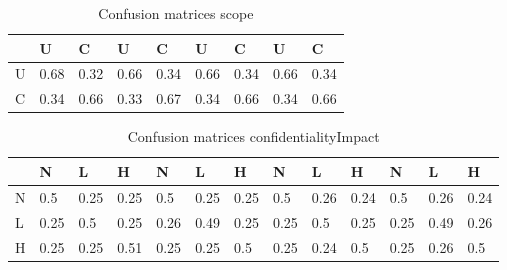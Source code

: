 \documentclass[11pt]{article}
\begin{document}
\begin{table}
	\caption{Confusion matrices scope}
	\label{table:mitre-scope}
	\begin{center}
		\begin{tabular}{l|l|l|l|l|l|l|l|l}\textbf{} & \textbf{U} & \textbf{C} & \textbf{U} & \textbf{C} & \textbf{U} & \textbf{C} & \textbf{U} & \textbf{C} \\
               \hline
               U                            & 0.68       & 0.32       & 0.66       & 0.34       & 0.66       & 0.34       & 0.66       & 0.34       \\
               C                            & 0.34       & 0.66       & 0.33       & 0.67       & 0.34       & 0.66       & 0.34       & 0.66       \\
		\end{tabular}
	\end{center}
\end{table}


\begin{table}
	\caption{Confusion matrices confidentialityImpact}
	\label{table:mitre-confidentialityImpact}
	\begin{center}
		\begin{tabular}{l|l|l|l|l|l|l|l|l|l|l|l|l}\textbf{} & \textbf{N} & \textbf{L} & \textbf{H} & \textbf{N} & \textbf{L} & \textbf{H} & \textbf{N} & \textbf{L} & \textbf{H} & \textbf{N} & \textbf{L} & \textbf{H} \\
               \hline
               N                                    & 0.5        & 0.25       & 0.25       & 0.5        & 0.25       & 0.25       & 0.5        & 0.26       & 0.24       & 0.5        & 0.26       & 0.24       \\
               L                                    & 0.25       & 0.5        & 0.25       & 0.26       & 0.49       & 0.25       & 0.25       & 0.5        & 0.25       & 0.25       & 0.49       & 0.26       \\
               H                                    & 0.25       & 0.25       & 0.51       & 0.25       & 0.25       & 0.5        & 0.25       & 0.24       & 0.5        & 0.25       & 0.26       & 0.5        \\
		\end{tabular}
	\end{center}
\end{table}
\end{document}
